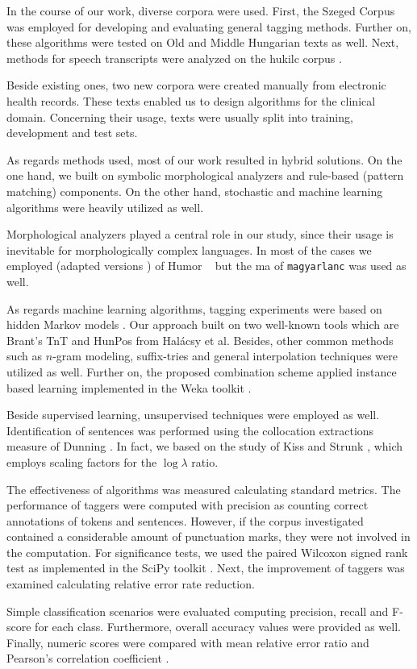 In the course of our work, diverse corpora were used. 
First, the Szeged Corpus \cite{Csendes2004} was employed for developing and evaluating general tagging methods.
Further on, these algorithms were tested on Old and Middle Hungarian \cite{Novak2013} texts as well.
Next, methods for speech transcripts were analyzed on the \acrshort{hukilc} corpus \cite{Matyus2014}.

Beside existing ones, two new corpora were created manually from electronic health records.
These texts enabled us to design algorithms for the clinical domain.
Concerning their usage, texts were usually split into training, development and test sets.

As regards methods used, most of our work resulted in hybrid solutions.
On the one hand, we built on symbolic morphological analyzers and rule-based (pattern matching) components. 
On the other hand, stochastic and machine learning algorithms were heavily utilized as well.

Morphological analyzers played a central role in our study, since their usage is inevitable for morphologically complex languages.
In most of the cases we employed (adapted versions \cite{Novak2013,NovakOMK,Orosz2013}) of Humor ~\cite{Proszeky1994,Novak2003,Proszeky2005} but the \acrshort{ma} of \texttt{magyarlanc} \cite{zsibrata2013magyarlanc} was used as well.

As regards machine learning algorithms, tagging experiments were based on hidden Markov models \cite{Rabiner1989,Samuelsson1993}. 
Our approach built on two well-known tools which are Brant's TnT \cite{Brants2000} and HunPos \cite{Halacsy2007} from Halácsy et al. 
Besides, other common methods such as $n$-gram modeling, suffix-tries and general interpolation techniques were utilized as well.
Further on, the proposed combination scheme applied instance based learning \cite{Aha1991} implemented in the Weka toolkit \cite{Hall2009}.

Beside supervised learning, unsupervised techniques were employed as well.
Identification of sentences was performed using the collocation extractions measure of Dunning \cite{dunning1993accurate}.
In fact, we based on the study of Kiss and Strunk \cite{kiss2006unsupervised}, which employs scaling factors for the $\log\lambda$ ratio.

The effectiveness of algorithms was measured calculating standard metrics.
The performance of taggers were computed with precision as counting correct annotations of tokens and sentences.
However, if the corpus investigated contained a considerable amount of punctuation marks, they were not involved in the computation.
For significance tests, we used the paired Wilcoxon signed rank test as implemented in the SciPy toolkit \cite{scipy}.
Next, the improvement of taggers was examined calculating relative error rate reduction. 

Simple classification scenarios were evaluated computing precision, recall and F-score for each class.
Furthermore, overall accuracy values were provided as well.
Finally, numeric scores were compared with mean relative error \cite{Witten2011} ratio and Pearson's correlation coefficient \cite{Witten2011}.